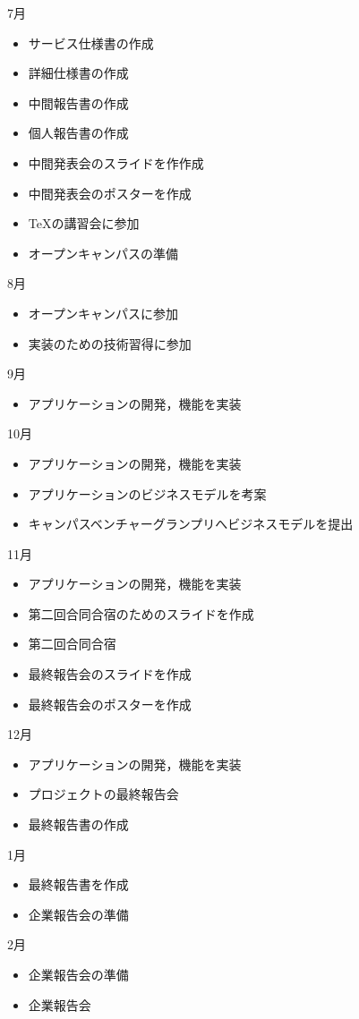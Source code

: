 7月
\begin{itemize}
\item サービス仕様書の作成
\item 詳細仕様書の作成
\item 中間報告書の作成
\item 個人報告書の作成
\item 中間発表会のスライドを作作成
\item 中間発表会のポスターを作成
\item TeXの講習会に参加
\item オープンキャンパスの準備
\end{itemize}
8月
\begin{itemize}
\item オープンキャンパスに参加
\item 実装のための技術習得に参加
\end{itemize}
9月
\begin{itemize}
\item アプリケーションの開発，機能を実装
\end{itemize}
10月
\begin{itemize}
\item アプリケーションの開発，機能を実装
\item アプリケーションのビジネスモデルを考案
\item キャンパスベンチャーグランプリへビジネスモデルを提出
\end{itemize}
11月
\begin{itemize}
\item アプリケーションの開発，機能を実装
\item 第二回合同合宿のためのスライドを作成
\item 第二回合同合宿
\item 最終報告会のスライドを作成
\item 最終報告会のポスターを作成
\end{itemize}
12月
\begin{itemize}
\item アプリケーションの開発，機能を実装
\item プロジェクトの最終報告会
\item 最終報告書の作成
\end{itemize}
1月
\begin{itemize}
\item 最終報告書を作成
\item 企業報告会の準備
\end{itemize}
2月
\begin{itemize}
\item 企業報告会の準備
\item 企業報告会
\end{itemize}
